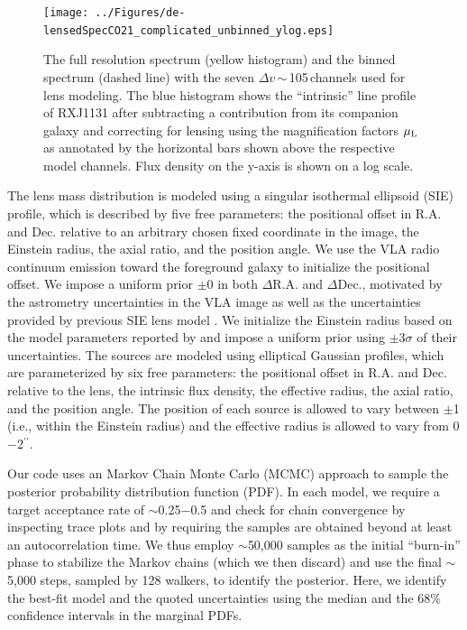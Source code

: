 \documentclass[]{emulateapj}
\begin{document}
\begin{figure}[!htbp]
\centering
\texttt{[image: ../Figures/de-lensedSpecCO21\_complicated\_unbinned\_ylog.eps]}
\caption{The full resolution \bco spectrum (yellow histogram) and 
the binned spectrum (dashed line) with the seven $\Delta v$\,$\sim$\,105\,\kms channels used for lens modeling. The 
blue histogram shows the ``intrinsic'' line profile of RXJ1131 
after subtracting a contribution from its companion galaxy and 
correcting for lensing using the magnification factors $\mu_{\rm L}$ as annotated by the horizontal bars shown
above the respective model channels. Flux density on the y-axis is shown on a log scale.
\label{fig:delensed}}
\end{figure}

The lens mass distribution is modeled using a singular isothermal
ellipsoid (SIE) profile, which is described by five free parameters: the
positional offset in R.A. and Dec. relative to an arbitrary chosen
fixed coordinate in the image, the Einstein radius, the axial ratio, and the
position angle. We use the VLA radio continuum emission toward
the foreground galaxy to initialize the positional offset. We impose a
uniform prior $\pm$0 in both $\Delta$R.A. and $\Delta$Dec.,
motivated by the astrometry uncertainties in the VLA image as well as
the uncertainties provided by previous SIE lens model .
We initialize the Einstein radius based on the model parameters reported by 
and impose a uniform prior using $\pm$3$\sigma$ of their uncertainties.
The sources are modeled using elliptical Gaussian profiles, which are
parameterized by six free parameters: the positional offset in R.A.
and Dec. relative to the lens, the intrinsic flux density, the effective
radius, the axial ratio, and the position angle. The position of each source
is allowed to vary between $\pm$1 (i.e., within the Einstein radius)
and the effective radius is allowed to vary from 0$-$2$^{\prime\prime}$.

Our code uses an Markov Chain Monte Carlo (MCMC) approach to sample the
posterior probability distribution function (PDF).
In each model, we require a target acceptance rate of $\sim$0.25$-$0.5
and check for chain convergence by inspecting trace plots
and by requiring the samples are obtained beyond at least an autocorrelation time.
We thus employ $\sim$50,000 samples as the initial ``burn-in'' phase
to stabilize the Markov chains (which we then discard) and
use the final $\sim$5,000 steps, sampled by 128 walkers, to identify
the posterior. Here, we
identify the best-fit model and the quoted uncertainties using the
median and the 68\% confidence intervals in the marginal PDFs.

\end{document}
